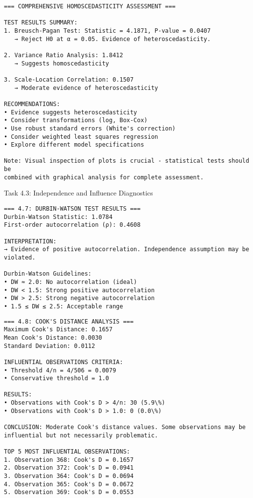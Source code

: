 \documentclass[11pt, twocolumn]{article}
\begin{document}
    \begin{Verbatim}[commandchars=\\\{\}]
=== COMPREHENSIVE HOMOSCEDASTICITY ASSESSMENT ===

TEST RESULTS SUMMARY:
1. Breusch-Pagan Test: Statistic = 4.1871, P-value = 0.0407
   → Reject H0 at α = 0.05. Evidence of heteroscedasticity.

2. Variance Ratio Analysis: 1.8412
   → Suggests homoscedasticity

3. Scale-Location Correlation: 0.1507
   → Moderate evidence of heteroscedasticity

RECOMMENDATIONS:
• Evidence suggests heteroscedasticity
• Consider transformations (log, Box-Cox)
• Use robust standard errors (White's correction)
• Consider weighted least squares regression
• Explore different model specifications

Note: Visual inspection of plots is crucial - statistical tests should be
combined with graphical analysis for complete assessment.
    \end{Verbatim}

    Task 4.3: Independence and Influence Diagnostics

    \begin{Verbatim}[commandchars=\\\{\}]
=== 4.7: DURBIN-WATSON TEST RESULTS ===
Durbin-Watson Statistic: 1.0784
First-order autocorrelation (ρ): 0.4608

INTERPRETATION:
→ Evidence of positive autocorrelation. Independence assumption may be violated.

Durbin-Watson Guidelines:
• DW ≈ 2.0: No autocorrelation (ideal)
• DW < 1.5: Strong positive autocorrelation
• DW > 2.5: Strong negative autocorrelation
• 1.5 ≤ DW ≤ 2.5: Acceptable range

    \end{Verbatim}

    \begin{Verbatim}[commandchars=\\\{\}]
=== 4.8: COOK'S DISTANCE ANALYSIS ===
Maximum Cook's Distance: 0.1657
Mean Cook's Distance: 0.0030
Standard Deviation: 0.0112

INFLUENTIAL OBSERVATIONS CRITERIA:
• Threshold 4/n = 4/506 = 0.0079
• Conservative threshold = 1.0

RESULTS:
• Observations with Cook's D > 4/n: 30 (5.9\%)
• Observations with Cook's D > 1.0: 0 (0.0\%)

CONCLUSION: Moderate Cook's distance values. Some observations may be
influential but not necessarily problematic.

TOP 5 MOST INFLUENTIAL OBSERVATIONS:
1. Observation 368: Cook's D = 0.1657
2. Observation 372: Cook's D = 0.0941
3. Observation 364: Cook's D = 0.0694
4. Observation 365: Cook's D = 0.0672
5. Observation 369: Cook's D = 0.0553

    \end{Verbatim}
\end{document}
